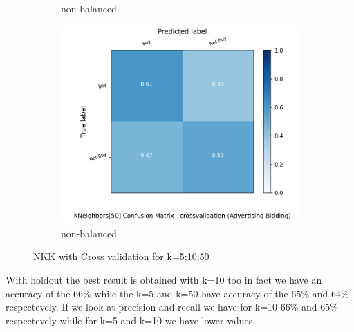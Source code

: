 \documentclass{article}
\begin{document}
\begin{figure}[H]
\begin{subfigure}{.5\textwidth}
		\caption{non-balanced}
	\end{subfigure}
	\begin{subfigure}{.5\textwidth}
		\centering
		\includegraphics[width=1.1\textwidth]{Plots/conv_KNeighbors_50_balance_True_crossvalidation}
		\caption{non-balanced}
	\end{subfigure}
	\caption{{\color{red}NKK with Cross validation for k=5;10;50}}
\end{figure}


With holdout the best result is  obtained with  k=10 too in fact we have an accuracy of the 66\% while the k=5 and k=50 have accuracy of the 65\% and 64\% respectevely.
If we look at precision and recall we have for k=10 66\% and 65\% respectevely while for k=5 and k=10 we have lower values.
\end{document}
